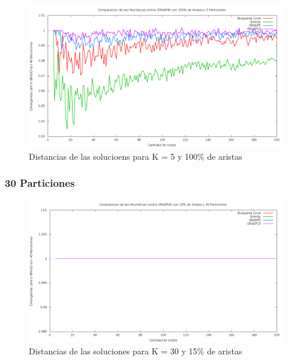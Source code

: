 \begin{figure}[H]
\begin{center}
\includegraphics[scale=0.3]{finales/muchosComparacionesCon5Particiones100Aristas.png}
\caption{Distancias de las solucioens para K = 5 y 100\% de aristas}
\end{center}
\end{figure}

\subsubsection{30 Particiones}

\begin{figure}[H]
\begin{center}
\includegraphics[scale=0.3]{finales/muchosComparacionesCon30Particiones15Aristas.png}
\caption{Distancias de las soluciones para K = 30 y 15\% de aristas}
\end{center}
\end{figure}

